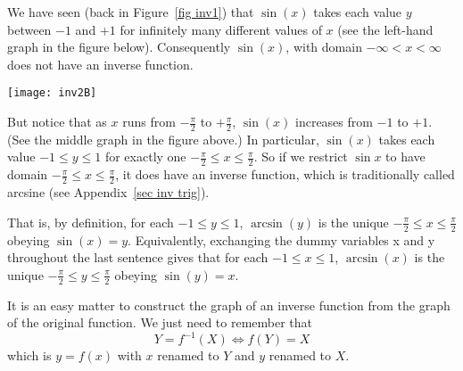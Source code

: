 \begin{eg}\label{eg_0_6_3}
We have seen (back in Figure~\ref{fig inv1}) that $\sin(x)$ takes each value $y$
between $-1$ and $+1$ for infinitely many different values of $x$ (see
the left-hand graph in the figure below). Consequently $\sin(x)$, with domain
$-\infty <x <\infty$ does not have an inverse function.
\begin{wfig}
\begin{center}
 \texttt{[image: inv2B]}
\end{center}
\end{wfig}
But notice that as $x$ runs from $-\frac{\pi}{2}$ to $+\frac{\pi}{2}$, $\sin(x)$ increases
from $-1$ to $+1$. (See the middle graph in the figure above.) In particular, $\sin(x)$
takes each value $-1 \le y\le 1$ for exactly one $-\frac{\pi}{2}\le x\le \frac{\pi}{2}$.
So if we restrict $\sin x$ to have domain $-\frac{\pi}{2}\le x\le \frac{\pi}{2}$, it does
have an inverse function, which is traditionally called arcsine (see Appendix~\ref{sec
inv trig}).

That is, by definition, for each $-1\le y\le 1$, $\arcsin(y)$ is the unique
$-\frac{\pi}{2}\le x\le \frac{\pi}{2}$ obeying $\sin(x)=y$. Equivalently, exchanging the
dummy variables x and y throughout the last sentence gives that for each $-1\le
x\le 1$, $\arcsin(x)$ is the unique $-\frac{\pi}{2}\le y\le \frac{\pi}{2}$
obeying $\sin(y)=x$.
\end{eg}



It is an easy matter to construct the graph of an inverse function
from the graph of the original function. We just need to remember that
\begin{equation*}
Y=f^{-1}(X)  \iff f(Y)=X
\end{equation*}
which is $y=f(x)$ with $x$ renamed to $Y$ and $y$ renamed to $X$.

